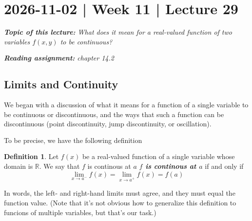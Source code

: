\documentclass[10pt]{article}
\DeclareRobustCommand{\demph}[1]{%
  \ifmmode
  {\color{Blue}#1}%
  \else
  {\color{Blue}\bfseries\slshape #1}%
  \fi
}
\theoremstyle{definition}
\newtheorem{definition}[theorem]{Definition}
\newcommand{\1}[1]{\textbf{1}_{\left[#1\right]}} %
\def\R{\mathbb{R}} %
\begin{document}
\newpage
\section{2026-11-02 | Week 11 | Lecture 29}

\begin{center}
  \begin{tcolorbox}[width=0.9\textwidth, colback=white, colframe=black]
    \textit{\textbf{Topic of this lecture:} What does it mean for a
      real-valued function of two variables $f(x,y)$ to be continuous?}

    \textit{\textbf{Reading assignment:} chapter 14.2}
  \end{tcolorbox}
\end{center}

\subsection{Limits and Continuity}

We began with a discussion of what it means for a function of a single
variable to be continuous or discontinuous, and the ways that such a function
can be discontinuous (point discontinuity, jump discontinuity, or oscillation).




To be precise, we have the following definition
\begin{definition}
  Let $f(x)$ be a real-valued function of a single variable whose domain is
  $\R$. We say that \demph{$f$ is continous at $a$} if and only if
  \begin{equation*}
    \lim_{x\to a^{-}} f(x) = \lim_{x\to a^{+}} f(x) = f(a)
  \end{equation*}
\end{definition}
In words, the left- and right-hand limits must agree, and they must equal the
function value. (Note that it's not obvious how to generalize this definition
to funcions of multiple variables, but that's our task.)
\end{document}
